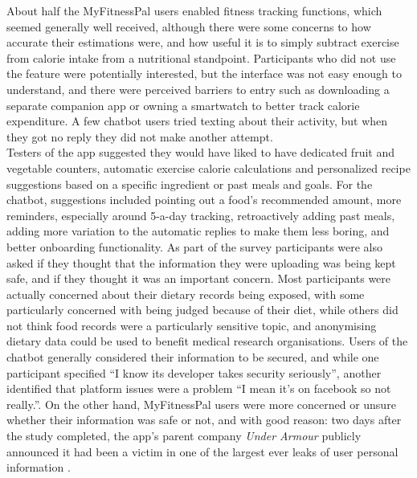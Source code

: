 About half the MyFitnessPal users enabled fitness tracking functions, which seemed generally well received, although there were some concerns to how accurate their estimations were, and how useful it is to simply subtract exercise from calorie intake from a nutritional standpoint. Participants who did not use the feature were potentially interested, but the interface was not easy enough to understand, and there were perceived barriers to entry such as downloading a separate companion app or owning a smartwatch to better track calorie expenditure. A few chatbot users tried texting about their activity, but when they got no reply they did not make another attempt.\\
Testers of the app suggested they would have liked to have dedicated fruit and vegetable counters, automatic exercise calorie calculations and personalized recipe suggestions based on a specific ingredient or past meals and goals. For the chatbot, suggestions included pointing out a food's recommended amount, more reminders, especially around 5-a-day tracking, retroactively adding past meals, adding more variation to the automatic replies to make them less boring, and better onboarding functionality.
As part of the survey participants were  also asked if they thought that the information they were uploading was being kept safe, and if they thought it was an important concern. Most participants were actually concerned about their dietary records being exposed, with some particularly concerned with being judged because of their diet, while others did not think food records were a particularly sensitive topic, and anonymising dietary data could be used to benefit medical research organisations. Users of the chatbot generally considered their information to be secured, and while one participant specified ``I know its developer takes security seriously'', another identified that platform issues were a problem ``I mean it's on facebook so not really.''. On the other hand, MyFitnessPal users were more concerned or unsure whether their information was safe or not, and with good reason: two days after the study completed, the app's parent company \textit{Under Armour} publicly announced it had been a victim in one of the largest ever leaks of user personal information \cite{underarmour}.
